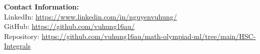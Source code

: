 \documentclass[12pt]{article}
\begin{document}
\vspace{2em}
\noindent\textbf{Contact Information:}\\[0.5em]
LinkedIn: \href{https://www.linkedin.com/in/nguyenvuhung/}{https://www.linkedin.com/in/nguyenvuhung/}\\[0.3em]
GitHub: \href{https://github.com/vuhung16au/}{https://github.com/vuhung16au/}\\[0.3em]
Repository: \href{https://github.com/vuhung16au/math-olympiad-ml/tree/main/HSC-Integrals}{https://github.com/vuhung16au/math-olympiad-ml/tree/main/HSC-Integrals}
\end{document}
